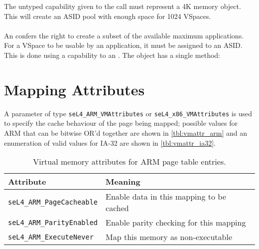 The untyped
capability given to the  call must represent a 4K memory object.
This will create an ASID pool with enough space for 1024 VSpaces.

\paragraph{}

An  confers the right to create a subset of the available
maximum applications. For a VSpace to be usable by an application, it
must be assigned to an ASID. This is done using a capability to an
. The  object has a single method:
\vspace{2ex}\\

\section{Mapping Attributes}
A parameter of type \texttt{seL4\_ARM\_VMAttributes} or
\texttt{seL4\_x86\_VMAttributes} is used to specify the cache behaviour of the
page being mapped; possible values for ARM that can be bitwise OR'd together are
shown in \autoref{tbl:vmattr_arm} \ifxeightsix and an enumeration of valid values
for IA-32 are shown in \autoref{tbl:vmattr_ia32}\fi.

\begin{table}[htb]
  \begin{center}
    \begin{tabularx}{\textwidth}{p{}X}
      \toprule
      Attribute & Meaning \\
      \midrule
      \texttt{seL4\_ARM\_PageCacheable} & Enable data in this mapping
      to be cached \\
      \texttt{seL4\_ARM\_ParityEnabled} & Enable parity checking for
      this mapping\\
      \texttt{seL4\_ARM\_ExecuteNever} & Map this memory as non-executable \\
      \bottomrule
    \end{tabularx}
    \caption{\label{tbl:vmattr_arm} Virtual memory attributes for ARM page
      table entries.}
  \end{center}
\end{table}

